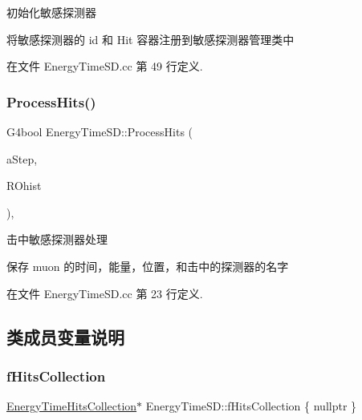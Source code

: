 初始化敏感探测器 

将敏感探测器的 id 和 Hit 容器注册到敏感探测器管理类中 

在文件 Energy\+Time\+S\+D.\+cc 第 49 行定义.

\mbox{\label{classEnergyTimeSD_a24131df6ca564ef0a71e49c4625d5477}} 
\subsubsection{\texorpdfstring{Process\+Hits()}{ProcessHits()}}
{\footnotesize\ttfamily G4bool Energy\+Time\+S\+D\+::\+Process\+Hits (\begin{DoxyParamCaption}\item[{G4\+Step $\ast$}]{a\+Step,  }\item[{G4\+Touchable\+History $\ast$}]{R\+Ohist }\end{DoxyParamCaption})\hspace{0.3cm}{\ttfamily [override]}, {\ttfamily [protected]}}



击中敏感探测器处理 

保存 muon 的时间，能量，位置，和击中的探测器的名字 

在文件 Energy\+Time\+S\+D.\+cc 第 23 行定义.



\subsection{类成员变量说明}
\mbox{\label{classEnergyTimeSD_a06ebf7e427ea561ac4d8ddbe761c4410}} 
\subsubsection{\texorpdfstring{f\+Hits\+Collection}{fHitsCollection}}
{\footnotesize\ttfamily \hyperlink{EnergyTimeHit_8hh_a16746facffb48be663356f32939fd35f}{Energy\+Time\+Hits\+Collection}$\ast$ Energy\+Time\+S\+D\+::f\+Hits\+Collection \{ nullptr \}\hspace{0.3cm}{\ttfamily [private]}}



